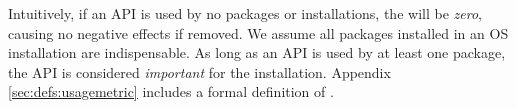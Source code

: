 
\noindent Intuitively, if an API is used by no packages or installations,
the \usagemetric{} will be {\em zero}, causing no negative effects if removed.
We assume all packages installed in an OS installation are indispensable.
As long as an API is used by at least one package,
the API is considered {\it important} for the installation.
Appendix \ref{sec:defs:usagemetric} includes a formal definition of \usagemetric{}.
 


